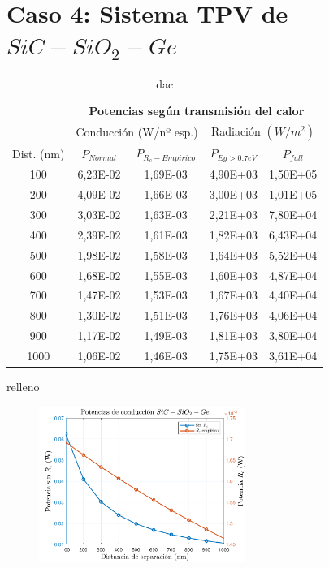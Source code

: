 \section{Caso 4: Sistema TPV de $SiC-SiO_2-Ge$}
\begin{table}[h]
	\centering
		\begin{tabular}{|c||c|c||c|c|}
		\hline
\multirow{2}{*}{ }& \multicolumn{4}{c|}{\textbf{\large Potencias según transmisión del calor}}\\ \cline{2-5}
& \multicolumn{2}{c||}{Conducción (W/nº esp.)}& \multicolumn{2}{c|}{Radiación $(W/m^2)$}\\ \hline
Dist. (nm)&$P_{Normal}$&$P_{R_c-Empirico}$&$P_{Eg>0.7eV}$&$P_{full}$\\ \hline \hline
100&6,23E-02&1,69E-03&4,90E+03&1,50E+05\\ \hline 
200&4,09E-02&1,66E-03&3,00E+03&1,01E+05\\ \hline 
300&3,03E-02&1,63E-03&2,21E+03&7,80E+04\\ \hline 
400&2,39E-02&1,61E-03&1,82E+03&6,43E+04\\ \hline 
500&1,98E-02&1,58E-03&1,64E+03&5,52E+04\\ \hline 
600&1,68E-02&1,55E-03&1,60E+03&4,87E+04\\ \hline 
700&1,47E-02&1,53E-03&1,67E+03&4,40E+04\\ \hline 
800&1,30E-02&1,51E-03&1,76E+03&4,06E+04\\ \hline 
900&1,17E-02&1,49E-03&1,81E+03&3,80E+04\\ \hline 
1000&1,06E-02&1,46E-03&1,75E+03&3,61E+04\\ \hline 
		\end{tabular}
	\caption{dac}
	\label{tab:dac}
\end{table}

relleno
\begin{figure}[H]
	\centering
		\includegraphics[width=0.6\textwidth]{figuras/Resultados/conduccion/pdf/Prc_SiCSiO2Ge.pdf}
	\caption{ }
	\label{fig:Prc_SiCSiO2Ge}
\end{figure}

